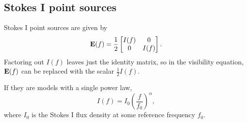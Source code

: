 \documentclass{book}
\begin{document}
\subsection{Stokes I point sources}

Stokes I point sources are given by
\begin{equation}
    {\bf E}(f) = \frac12 \begin{bmatrix} I(f) & 0 \\ 0 & I(f) \end{bmatrix}.
\end{equation}
Factoring out $I(f)$ leaves just the identity matrix, so in the visibility equation, ${\bf E}(f)$ can be replaced with the scalar $\frac12 I(f)$.

If they are models with a single power law,
\begin{equation}
    I(f) = I_0 \left(\frac{f}{f_0}\right)^\alpha,
\end{equation}
where $I_0$ is the Stokes I flux density at some reference frequency $f_0$.
\end{document}
